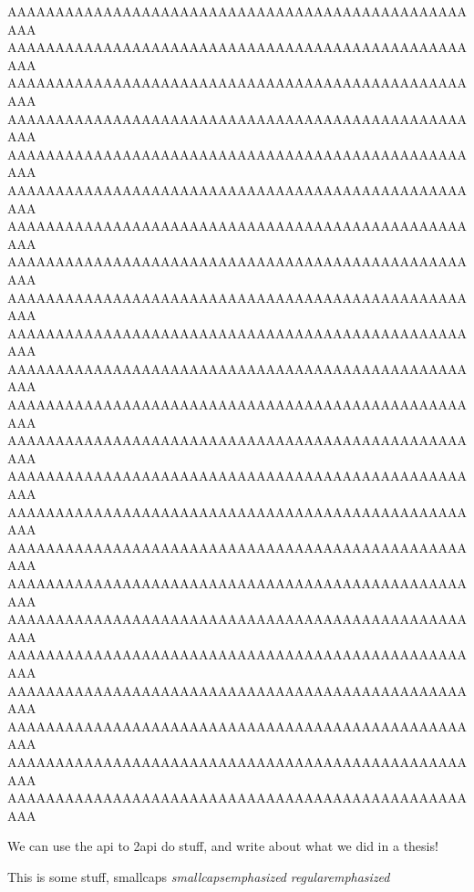 \documentclass[final,11pt,baselinegrid]{../../uit-thesis}
\begin{document}
AAAAAAAAAAAAAAAAAAAAAAAAAAAAAAAAAAAAAAAAAAAAAAAAAAA\newline
%
AAAAAAAAAAAAAAAAAAAAAAAAAAAAAAAAAAAAAAAAAAAAAAAAAAA\newline
AAAAAAAAAAAAAAAAAAAAAAAAAAAAAAAAAAAAAAAAAAAAAAAAAAA\newline
AAAAAAAAAAAAAAAAAAAAAAAAAAAAAAAAAAAAAAAAAAAAAAAAAAA\newline
AAAAAAAAAAAAAAAAAAAAAAAAAAAAAAAAAAAAAAAAAAAAAAAAAAA\newline
AAAAAAAAAAAAAAAAAAAAAAAAAAAAAAAAAAAAAAAAAAAAAAAAAAA\newline
AAAAAAAAAAAAAAAAAAAAAAAAAAAAAAAAAAAAAAAAAAAAAAAAAAA\newline
AAAAAAAAAAAAAAAAAAAAAAAAAAAAAAAAAAAAAAAAAAAAAAAAAAA\newline
AAAAAAAAAAAAAAAAAAAAAAAAAAAAAAAAAAAAAAAAAAAAAAAAAAA\newline
AAAAAAAAAAAAAAAAAAAAAAAAAAAAAAAAAAAAAAAAAAAAAAAAAAA\newline
AAAAAAAAAAAAAAAAAAAAAAAAAAAAAAAAAAAAAAAAAAAAAAAAAAA\newline
AAAAAAAAAAAAAAAAAAAAAAAAAAAAAAAAAAAAAAAAAAAAAAAAAAA\newline
AAAAAAAAAAAAAAAAAAAAAAAAAAAAAAAAAAAAAAAAAAAAAAAAAAA\newline
AAAAAAAAAAAAAAAAAAAAAAAAAAAAAAAAAAAAAAAAAAAAAAAAAAA\newline
AAAAAAAAAAAAAAAAAAAAAAAAAAAAAAAAAAAAAAAAAAAAAAAAAAA\newline
AAAAAAAAAAAAAAAAAAAAAAAAAAAAAAAAAAAAAAAAAAAAAAAAAAA\newline
AAAAAAAAAAAAAAAAAAAAAAAAAAAAAAAAAAAAAAAAAAAAAAAAAAA\newline
AAAAAAAAAAAAAAAAAAAAAAAAAAAAAAAAAAAAAAAAAAAAAAAAAAA\newline
AAAAAAAAAAAAAAAAAAAAAAAAAAAAAAAAAAAAAAAAAAAAAAAAAAA\newline
AAAAAAAAAAAAAAAAAAAAAAAAAAAAAAAAAAAAAAAAAAAAAAAAAAA\newline
AAAAAAAAAAAAAAAAAAAAAAAAAAAAAAAAAAAAAAAAAAAAAAAAAAA\newline
AAAAAAAAAAAAAAAAAAAAAAAAAAAAAAAAAAAAAAAAAAAAAAAAAAA\newline
AAAAAAAAAAAAAAAAAAAAAAAAAAAAAAAAAAAAAAAAAAAAAAAAAAA\newline
\lipsum[1]
\lipsum[1]
\lipsum[1-7]


We can use the \ac{api} to \ac{2api} do stuff, and write about what we did in a \gls{thesis}!

This is some stuff, {\sc smallcaps {\em smallcapsemphasized}} {\em regularemphasized}
\end{document}

